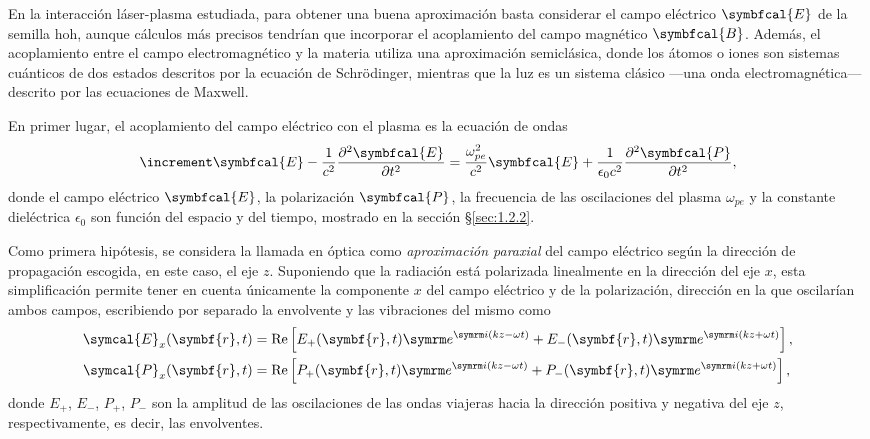 En la interacción láser-plasma estudiada, para obtener una buena aproximación basta considerar el campo eléctrico $\symbfcal{E}$ de la semilla \acrshort{hoh}, aunque cálculos más precisos tendrían que incorporar el acoplamiento del campo magnético $\symbfcal{B}$. Además, el acoplamiento entre el campo electromagnético y la materia utiliza una aproximación semiclásica, donde los átomos o iones son sistemas cuánticos de dos estados descritos por la ecuación de Schrödinger, mientras que la luz es un sistema clásico ---una onda electromagnética--- descrito por las ecuaciones de Maxwell.

En primer lugar, el acoplamiento del campo eléctrico con el plasma es la ecuación de ondas 
\begin{equation}\label{eq:3.1}
  \laplacian \symbfcal{E} - \frac{1}{c^{2}}\pdvN{\symbfcal{E}}{t}{2} = \frac{\omega^{2}_{pe}}{c^{2}}\symbfcal{E} + \frac{1}{\epsilon_{0}c^{2}}\pdvN{\symbfcal{P}}{t}{2},
\end{equation}
donde el campo eléctrico $\symbfcal{E}$, la polarización $\symbfcal{P}$, la frecuencia de las oscilaciones del plasma $\omega_{pe}$ y la constante dieléctrica $\epsilon_{0}$ son función del espacio y del tiempo, mostrado en la sección \S\ref{sec:1.2.2}. 

Como primera hipótesis, se considera la llamada en óptica\autocite{bornPrinciplesOptics60th2019} como \emph{aproximación paraxial} del campo eléctrico según la dirección de propagación escogida, en este caso, el eje $z$. Suponiendo que la radiación está polarizada linealmente en la dirección del eje $x$, esta simplificación permite tener en cuenta únicamente la componente $x$ del campo eléctrico y de la polarización, dirección en la que oscilarían ambos campos, escribiendo por separado la envolvente y las vibraciones del mismo como
\begin{align}
  \label{eq:3.2}
  \symcal{E}_{x}(\symbf{r},t) &= \RE \left[E_{+}(\symbf{r},t)\eu^{\iu (kz - \omega t)} + E_{-}(\symbf{r},t)\eu^{\iu (kz + \omega t)}\right], \\
  \label{eq:3.3}
  \symcal{P}_{x}(\symbf{r},t) &= \RE \left[P_{+}(\symbf{r},t)\eu^{\iu (kz - \omega t)} + P_{-}(\symbf{r},t)\eu^{\iu (kz + \omega t)}\right], 
\end{align}
donde $E_{+}$, $E_{-}$, $P_{+}$, $P_{-}$ son la amplitud de las oscilaciones de las ondas viajeras hacia la dirección positiva y negativa del eje $z$, respectivamente, es decir, las envolventes. 

